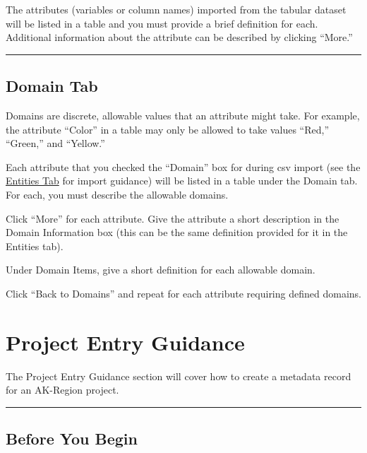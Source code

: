 \documentclass[
]{book}
\begin{document}
The attributes (variables or column names) imported from the tabular dataset will be listed in a table and you must provide a brief definition for each. Additional information about the attribute can be described by clicking ``More.''

\begin{center}\rule{0.5\linewidth}{\linethickness}\end{center}

\hypertarget{domain-tab}{%
\section*{Domain Tab}\label{domain-tab}}

Domains are discrete, allowable values that an attribute might take. For example, the attribute ``Color'' in a table may only be allowed to take values ``Red,'' ``Green,'' and ``Yellow.''

Each attribute that you checked the ``Domain'' box for during csv import (see the \protect\hyperlink{entities-tab}{Entities Tab} for import guidance) will be listed in a table under the Domain tab. For each, you must describe the allowable domains.

Click ``More'' for each attribute. Give the attribute a short description in the Domain Information box (this can be the same definition provided for it in the Entities tab).

Under Domain Items, give a short definition for each allowable domain.

Click ``Back to Domains'' and repeat for each attribute requiring defined domains.

\hypertarget{project-entry-guidance}{%
\chapter*{Project Entry Guidance}\label{project-entry-guidance}}

The Project Entry Guidance section will cover how to create a metadata record for an AK-Region project.

\begin{center}\rule{0.5\linewidth}{\linethickness}\end{center}

\hypertarget{before-you-begin}{%
\section*{Before You Begin}\label{before-you-begin}}
\end{document}
